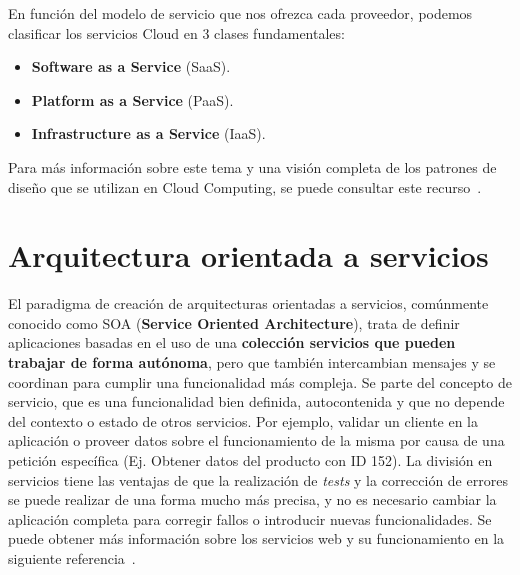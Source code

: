 En función del modelo de servicio que nos ofrezca cada proveedor, podemos clasificar los servicios Cloud en 3 clases fundamentales:

\begin{itemize}
\item \textbf{Software as a Service} (SaaS).
\item \textbf{Platform as a Service} (PaaS).
\item \textbf{Infrastructure as a Service} (IaaS).
\end{itemize}

Para más información sobre este tema y una visión completa de los patrones de diseño que se utilizan en Cloud Computing, se puede consultar este recurso~\cite{cloudpatts}.

\section{Arquitectura orientada a servicios}\label{sec:soa}
El paradigma de creación de arquitecturas orientadas a servicios, comúnmente conocido como SOA (\textbf{Service Oriented Architecture}), trata de definir aplicaciones basadas en el uso de una \textbf{colección servicios que pueden trabajar de forma autónoma}, pero que también intercambian mensajes y se coordinan para cumplir una funcionalidad más compleja. Se parte del concepto de servicio, que es una funcionalidad bien definida, autocontenida y que no depende del contexto o estado de otros servicios. Por ejemplo, validar un cliente en la aplicación o proveer datos sobre el funcionamiento de la misma por causa de una petición específica (Ej. Obtener datos del producto con ID 152). La división en servicios tiene las ventajas de que la realización de \textit{tests} y la corrección de errores se puede realizar de una forma mucho más precisa, y no es necesario cambiar la aplicación completa para corregir fallos o introducir nuevas funcionalidades. Se puede obtener más información sobre los servicios web y su funcionamiento en la siguiente referencia~\cite{wscom}.

